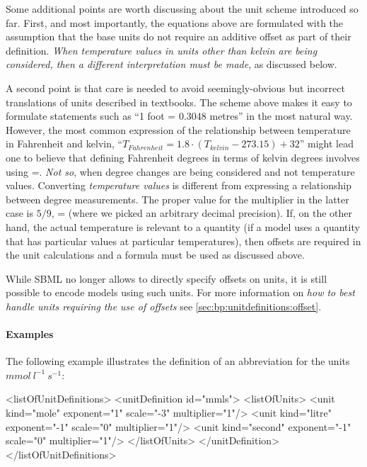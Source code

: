 \label{sec:unit-simple-approach}
Some additional points are worth discussing about the unit scheme
introduced so far.  First, and most importantly, the equations
above are formulated with the assumption that the base units do
not require an additive offset as part of their definition.
\emph{When temperature values in units other than kelvin are being
  considered, then a different interpretation must be made}, as
discussed below.

A second point is that care is needed to avoid seemingly-obvious
but incorrect translations of units described in textbooks.  The
scheme above makes it easy to formulate statements such as ``1
foot = 0.3048 metres'' in the most natural way.  However, the most
common expression of the relationship between temperature in
Fahrenheit and kelvin, ``$T_{Fahrenheit} = 1.8 \cdot (T_{kelvin} -
273.15) + 32$'' might lead one to believe that defining Fahrenheit
degrees in terms of kelvin degrees involves using
=.  \emph{Not so}, when degree changes
are being considered and not temperature values.  Converting
\emph{temperature values} is different from expressing a
relationship between degree measurements.  The proper value for
the multiplier in the latter case is $5/9$, \ie
{}= (where we picked an arbitrary
decimal precision).  If, on the other hand, the actual temperature
is relevant to a quantity (\eg if a model uses a quantity that has
particular values at particular temperatures), then offsets are
required in the unit calculations and a formula must be used as
discussed above.

While SBML no longer allows to directly specify offsets  on units, it is still possible
to encode models using such units. For more information on \emph{how to best 
handle units requiring the use of offsets} see \ref{sec:bp:unitdefinitions:offset}. 

\paragraph{Examples}

The following example illustrates the definition of an
abbreviation  for the units $mmol\ l^{-1}\ s^{-1}$:

\begin{example}
<listOfUnitDefinitions>
    <unitDefinition id="mmls">
        <listOfUnits>
            <unit kind="mole"   exponent="1"  scale="-3" multiplier="1"/>
            <unit kind="litre"  exponent="-1" scale="0"  multiplier="1"/>
            <unit kind="second" exponent="-1" scale="0"  multiplier="1"/>
        </listOfUnits>
    </unitDefinition>
</listOfUnitDefinitions>
\end{example}


